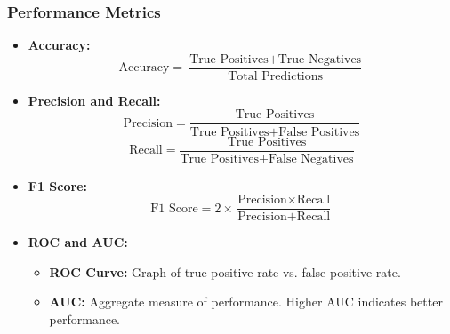 \documentclass[aspectratio=169]{beamer}
\begin{document}
\begin{frame}[fragile]
    \frametitle{Performance Metrics}
    \begin{itemize}
        \item \textbf{Accuracy:}
        \begin{equation}
            \text{Accuracy} = \frac{\text{True Positives} + \text{True Negatives}}{\text{Total Predictions}}
        \end{equation}
        
        \item \textbf{Precision and Recall:}
        \begin{equation}
            \text{Precision} = \frac{\text{True Positives}}{\text{True Positives} + \text{False Positives}}
        \end{equation}
        \begin{equation}
            \text{Recall} = \frac{\text{True Positives}}{\text{True Positives} + \text{False Negatives}}
        \end{equation}

        \item \textbf{F1 Score:}
        \begin{equation}
            \text{F1 Score} = 2 \times \frac{\text{Precision} \times \text{Recall}}{\text{Precision} + \text{Recall}}
        \end{equation}

        \item \textbf{ROC and AUC:}
            \begin{itemize}
                \item \textbf{ROC Curve:} Graph of true positive rate vs. false positive rate.
                \item \textbf{AUC:} Aggregate measure of performance. Higher AUC indicates better performance.
            \end{itemize}
    \end{itemize}
\end{frame}
\end{document}
